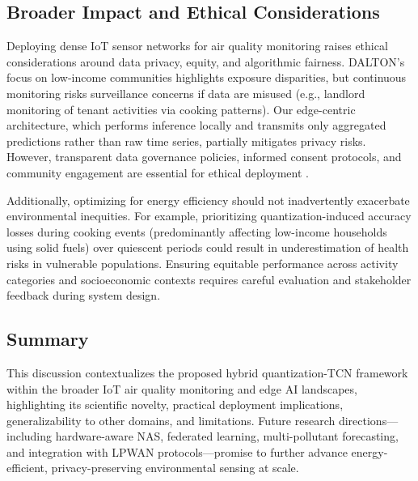 \subsection{Broader Impact and Ethical Considerations}

Deploying dense IoT sensor networks for air quality monitoring raises ethical considerations around data privacy, equity, and algorithmic fairness. DALTON's focus on low-income communities highlights exposure disparities, but continuous monitoring risks surveillance concerns if data are misused (e.g., landlord monitoring of tenant activities via cooking patterns). Our edge-centric architecture, which performs inference locally and transmits only aggregated predictions rather than raw time series, partially mitigates privacy risks. However, transparent data governance policies, informed consent protocols, and community engagement are essential for ethical deployment \cite{karmakar2024exploring}.

Additionally, optimizing for energy efficiency should not inadvertently exacerbate environmental inequities. For example, prioritizing quantization-induced accuracy losses during cooking events (predominantly affecting low-income households using solid fuels) over quiescent periods could result in underestimation of health risks in vulnerable populations. Ensuring equitable performance across activity categories and socioeconomic contexts requires careful evaluation and stakeholder feedback during system design.

\subsection{Summary}

This discussion contextualizes the proposed hybrid quantization-TCN framework within the broader IoT air quality monitoring and edge AI landscapes, highlighting its scientific novelty, practical deployment implications, generalizability to other domains, and limitations. Future research directions—including hardware-aware NAS, federated learning, multi-pollutant forecasting, and integration with LPWAN protocols—promise to further advance energy-efficient, privacy-preserving environmental sensing at scale.